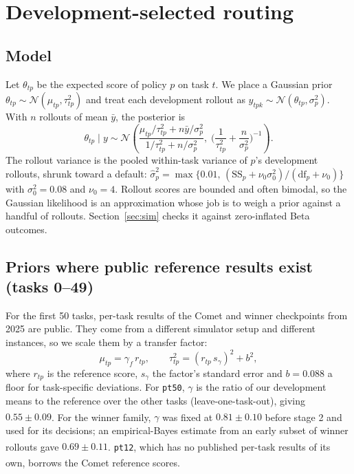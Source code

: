 \documentclass[10pt]{article}
\newcommand{\code}[1]{\texttt{#1}}
\newcommand{\pl}{\textsuperscript{\dag}}
\begin{document}
\section{Development-selected routing}
\label{sec:routing}

\subsection{Model}
\label{sec:model}
Let $\theta_{tp}$ be the expected score of policy $p$ on task $t$. We place a Gaussian prior $\theta_{tp}\sim\mathcal N(\mu_{tp},\tau_{tp}^2)$ and treat each development rollout as $y_{tpk}\sim\mathcal N(\theta_{tp},\sigma_p^2)$. With $n$ rollouts of mean $\bar y$, the posterior is
\begin{equation}
\theta_{tp}\mid y \sim \mathcal N\!\left(\frac{\mu_{tp}/\tau_{tp}^2 + n\bar y/\sigma_p^2}{1/\tau_{tp}^2+n/\sigma_p^2},\;\Big(\frac{1}{\tau_{tp}^2}+\frac{n}{\sigma_p^2}\Big)^{-1}\right).
\label{eq:post}
\end{equation}
The rollout variance is the pooled within-task variance of $p$'s development rollouts, shrunk toward a default: $\hat\sigma_p^2=\max\{0.01,\,(\mathrm{SS}_p+\nu_0\sigma_0^2)/(\mathrm{df}_p+\nu_0)\}$ with $\sigma_0^2=0.08$ and $\nu_0=4$. Rollout scores are bounded and often bimodal, so the Gaussian likelihood is an approximation whose job is to weigh a prior against a handful of rollouts. Section~\ref{sec:sim} checks it against zero-inflated Beta outcomes.

\subsection{Priors where public reference results exist (tasks 0--49)}
For the first 50 tasks, per-task results of the Comet and winner checkpoints from 2025 are public. They come from a different simulator setup and different instances, so we scale them by a transfer factor:
\begin{equation}
\mu_{tp}=\gamma_f\, r_{tp},\qquad \tau_{tp}^2=(r_{tp}\,s_{\gamma})^2+b^2,
\end{equation}
where $r_{tp}$ is the reference score, $s_\gamma$ the factor's standard error and $b=0.088$ a floor for task-specific deviations. For \code{pt50}, $\gamma$ is the ratio of our development means to the reference over the other tasks (leave-one-task-out), giving $0.55\pm0.09$\pl. For the winner family, $\gamma$ was fixed at $0.81\pm0.10$\pl{} before stage 2 and used for its decisions; an empirical-Bayes estimate from an early subset of winner rollouts gave $0.69\pm0.11$\pl. \code{pt12}, which has no published per-task results of its own, borrows the Comet reference scores\pl.
\end{document}
